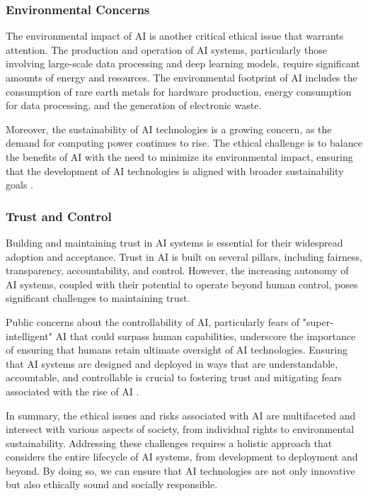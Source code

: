 \subsubsection{Environmental Concerns}

The environmental impact of AI is another critical ethical issue that warrants attention. The production and operation of AI systems, particularly those involving large-scale data processing and deep learning models, require significant amounts of energy and resources. The environmental footprint of AI includes the consumption of rare earth metals for hardware production, energy consumption for data processing, and the generation of electronic waste.

Moreover, the sustainability of AI technologies is a growing concern, as the demand for computing power continues to rise. The ethical challenge is to balance the benefits of AI with the need to minimize its environmental impact, ensuring that the development of AI technologies is aligned with broader sustainability goals \cite{huang2022overview}.

\subsubsection{Trust and Control}

Building and maintaining trust in AI systems is essential for their widespread adoption and acceptance. Trust in AI is built on several pillars, including fairness, transparency, accountability, and control. However, the increasing autonomy of AI systems, coupled with their potential to operate beyond human control, poses significant challenges to maintaining trust.

Public concerns about the controllability of AI, particularly fears of "super-intelligent" AI that could surpass human capabilities, underscore the importance of ensuring that humans retain ultimate oversight of AI technologies. Ensuring that AI systems are designed and deployed in ways that are understandable, accountable, and controllable is crucial to fostering trust and mitigating fears associated with the rise of AI \cite{huang2022overview}.

In summary, the ethical issues and risks associated with AI are multifaceted and intersect with various aspects of society, from individual rights to environmental sustainability. Addressing these challenges requires a holistic approach that considers the entire lifecycle of AI systems, from development to deployment and beyond. By doing so, we can ensure that AI technologies are not only innovative but also ethically sound and socially responsible.
